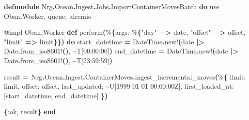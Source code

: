 \documentclass[11pt,a4paper,greek,twoside]{template-xe}
\newenvironment{Shaded}{\begin{english}\begin{snugshade}}{\end{snugshade}\end{english}}
\newcommand{\BaseNTok}[1]{\textcolor[rgb]{0.00,0.00,0.81}{#1}}
\newcommand{\ConstantTok}[1]{\textcolor[rgb]{0.56,0.35,0.01}{#1}}
\newcommand{\DecValTok}[1]{\textcolor[rgb]{0.00,0.00,0.81}{#1}}
\newcommand{\FunctionTok}[1]{\textcolor[rgb]{0.13,0.29,0.53}{\textbf{#1}}}
\newcommand{\ImportTok}[1]{#1}
\newcommand{\KeywordTok}[1]{\textcolor[rgb]{0.13,0.29,0.53}{\textbf{#1}}}
\newcommand{\NormalTok}[1]{#1}
\newcommand{\OperatorTok}[1]{\textcolor[rgb]{0.81,0.36,0.00}{\textbf{#1}}}
\newcommand{\OtherTok}[1]{\textcolor[rgb]{0.56,0.35,0.01}{#1}}
\newcommand{\StringTok}[1]{\textcolor[rgb]{0.31,0.60,0.02}{#1}}
\newcommand{\VariableTok}[1]{\textcolor[rgb]{0.00,0.00,0.00}{#1}}
\begin{document}
\begin{Shaded}
\begin{Highlighting}[]
\KeywordTok{defmodule} \ConstantTok{Nrg}\OperatorTok{.}\ConstantTok{Ocean}\OperatorTok{.}\ConstantTok{Ingest}\OperatorTok{.}\ConstantTok{Jobs}\OperatorTok{.}\ConstantTok{ImportContainerMovesBatch} \KeywordTok{do}
  \ImportTok{use} \ConstantTok{Oban}\OperatorTok{.}\ConstantTok{Worker}\NormalTok{, }\VariableTok{queue:} \VariableTok{:dremio}

  \OtherTok{@impl} \ConstantTok{Oban}\OperatorTok{.}\ConstantTok{Worker}
  \KeywordTok{def}\NormalTok{ perform}\FunctionTok{(}\NormalTok{\%}\FunctionTok{\{}\VariableTok{args:}\NormalTok{ \%}\FunctionTok{\{}\StringTok{"day"} \OperatorTok{=\textgreater{}}\NormalTok{ date, }\StringTok{"offset"} \OperatorTok{=\textgreater{}}\NormalTok{ offset, }\StringTok{"limit"} \OperatorTok{=\textgreater{}}\NormalTok{ limit}\FunctionTok{\}\})} \KeywordTok{do}
\NormalTok{    start\_datetime }\OperatorTok{=} \ConstantTok{DateTime}\OperatorTok{.}\NormalTok{new!}\FunctionTok{(}\NormalTok{date }\OperatorTok{|\textgreater{}} \ConstantTok{Date}\OperatorTok{.}\NormalTok{from\_iso8601!}\FunctionTok{()}\NormalTok{, }\OperatorTok{\textasciitilde{}}\NormalTok{T}\OtherTok{[}\DecValTok{00}\NormalTok{:}\DecValTok{00}\NormalTok{:}\DecValTok{00}\OtherTok{]}\FunctionTok{)}
\NormalTok{    end\_datetime }\OperatorTok{=} \ConstantTok{DateTime}\OperatorTok{.}\NormalTok{new!}\FunctionTok{(}\NormalTok{date }\OperatorTok{|\textgreater{}} \ConstantTok{Date}\OperatorTok{.}\NormalTok{from\_iso8601!}\FunctionTok{()}\NormalTok{, }\OperatorTok{\textasciitilde{}}\NormalTok{T}\OtherTok{[}\DecValTok{23}\NormalTok{:}\DecValTok{59}\NormalTok{:}\DecValTok{59}\OtherTok{]}\FunctionTok{)}

\NormalTok{    result }\OperatorTok{=}
      \ConstantTok{Nrg}\OperatorTok{.}\ConstantTok{Ocean}\OperatorTok{.}\ConstantTok{Ingest}\OperatorTok{.}\ConstantTok{ContainerMoves}\OperatorTok{.}\NormalTok{ingest\_incremental\_moves}\FunctionTok{(}\NormalTok{\%}\FunctionTok{\{}
        \VariableTok{limit:}\NormalTok{ limit,}
        \VariableTok{offset:}\NormalTok{ offset,}
        \VariableTok{last\_updated:} \OperatorTok{\textasciitilde{}}\NormalTok{U}\OtherTok{[}\DecValTok{1999}\BaseNTok{{-}01{-}01} \DecValTok{00}\NormalTok{:}\DecValTok{00}\NormalTok{:}\DecValTok{00}\NormalTok{Z}\OtherTok{]}\NormalTok{,}
        \VariableTok{first\_loaded\_at:} \OtherTok{[}\NormalTok{start\_datetime, end\_datetime}\OtherTok{]}
      \FunctionTok{\})}

    \FunctionTok{\{}\VariableTok{:ok}\NormalTok{, result}\FunctionTok{\}}
  \KeywordTok{end}


\end{Highlighting}
\end{Shaded}
\end{document}
